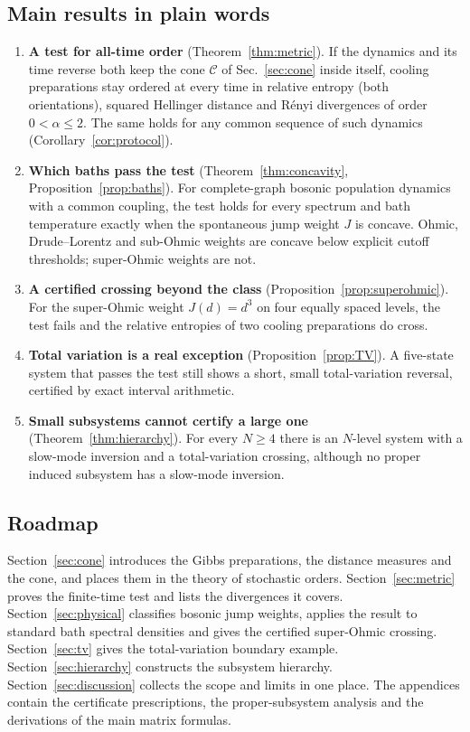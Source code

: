 \documentclass[11pt,a4paper]{article}
\theoremstyle{remark}\newtheorem{remark}[theorem]{Remark}
\newcommand{\C}{\mathcal C}
\begin{document}
\subsection{Main results in plain words}
\begin{enumerate}[label=\arabic*.]
\item \textbf{A test for all-time order} (Theorem~\ref{thm:metric}). If the dynamics and its time reverse both keep the cone $\C$ of Sec.~\ref{sec:cone} inside itself, cooling preparations stay ordered at every time in relative entropy (both orientations), squared Hellinger distance and R\'enyi divergences of order $0<\alpha\le2$. The same holds for any common sequence of such dynamics (Corollary~\ref{cor:protocol}).
\item \textbf{Which baths pass the test} (Theorem~\ref{thm:concavity}, Proposition~\ref{prop:baths}). For complete-graph bosonic population dynamics with a common coupling, the test holds for every spectrum and bath temperature exactly when the spontaneous jump weight $J$ is concave. Ohmic, Drude--Lorentz and sub-Ohmic weights are concave below explicit cutoff thresholds; super-Ohmic weights are not.
\item \textbf{A certified crossing beyond the class} (Proposition~\ref{prop:superohmic}). For the super-Ohmic weight $J(d)=d^3$ on four equally spaced levels, the test fails and the relative entropies of two cooling preparations do cross.
\item \textbf{Total variation is a real exception} (Proposition~\ref{prop:TV}). A five-state system that passes the test still shows a short, small total-variation reversal, certified by exact interval arithmetic.
\item \textbf{Small subsystems cannot certify a large one} (Theorem~\ref{thm:hierarchy}). For every $N\ge4$ there is an $N$-level system with a slow-mode inversion and a total-variation crossing, although no proper induced subsystem has a slow-mode inversion.
\end{enumerate}

\subsection{Roadmap}
Section~\ref{sec:cone} introduces the Gibbs preparations, the distance measures and the cone, and places them in the theory of stochastic orders. Section~\ref{sec:metric} proves the finite-time test and lists the divergences it covers. Section~\ref{sec:physical} classifies bosonic jump weights, applies the result to standard bath spectral densities and gives the certified super-Ohmic crossing. Section~\ref{sec:tv} gives the total-variation boundary example. Section~\ref{sec:hierarchy} constructs the subsystem hierarchy. Section~\ref{sec:discussion} collects the scope and limits in one place. The appendices contain the certificate prescriptions, the proper-subsystem analysis and the derivations of the main matrix formulas.
\end{document}
